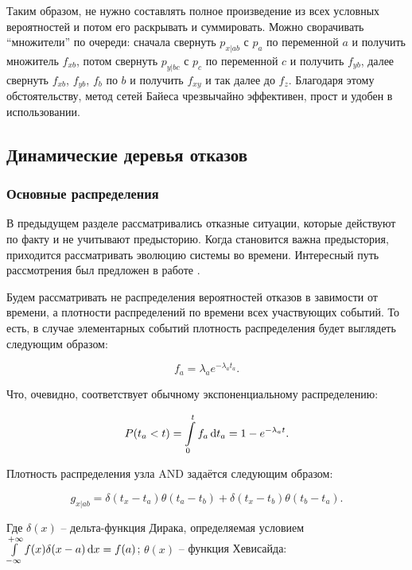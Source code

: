 \documentclass[a4paper, 12pt]{article}
\begin{document}
Таким образом, не нужно составлять полное произведение из всех условных вероятностей и потом его раскрывать и суммировать. Можно сворачивать ``множители'' по очереди: сначала свернуть $p_{x|ab}$ с $p_a$ по переменной $a$ и получить множитель $f_{xb}$, потом свернуть $p_{y|bc}$ с $p_c$ по переменной $c$ и получить $f_{yb}$, далее свернуть $f_{xb}$, $f_{yb}$, $f_b$ по $b$ и получить $f_{xy}$ и так далее до $f_z$. Благодаря этому обстоятельству, метод сетей Байеса чрезвычайно эффективен, прост и удобен в использовании.

\subsection{Динамические деревья отказов}

\subsubsection{Основные распределения}

В предыдущем разделе рассматривались отказные ситуации, которые действуют по факту и не учитывают предысторию. Когда становится важна предыстория, приходится рассматривать эволюцию системы во времени. Интересный путь рассмотрения был предложен в работе \cite{barel}.

Будем рассматривать не распределения вероятностей отказов в завимости от времени, а плотности распределений по времени всех участвующих событий. То есть, в случае элементарных событий плотность распределения будет выглядеть следующим образом:

\begin{equation*}
  f_a = \lambda_a e^{-\lambda_a t_a}.
\end{equation*}

Что, очевидно, соответствует обычному экспоненциальному распределению:

\begin{equation*}
  P(t_a < t) = \int\limits_0^t f_a \dif t_a = 1 - e^{-\lambda_a t}.
\end{equation*}

Плотность распределения узла AND задаётся следующим образом:

\begin{equation}
  \label{eq:andDistr}
  g_{x|ab} = \delta(t_x - t_a) \theta(t_a - t_b) + \delta(t_x - t_b) \theta(t_b - t_a).
\end{equation}

Где $\delta(x)$ -- дельта-функция Дирака, определяемая условием $\int\limits_{-\infty}^{+\infty} f(x) \delta(x - a) \dif x = f(a)$; $\theta(x)$ -- функция Хевисайда:
\end{document}
